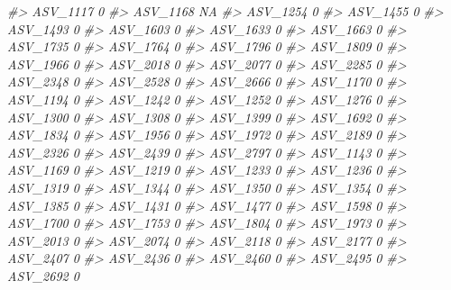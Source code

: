 \documentclass[
]{article}
\newenvironment{Shaded}{\begin{snugshade}}{\end{snugshade}}
\newcommand{\CommentTok}[1]{\textcolor[rgb]{0.56,0.35,0.01}{\textit{#1}}}
\begin{document}
\begin{Shaded}
\begin{Highlighting}[]
\CommentTok{\#\textgreater{} ASV\_1117  0}
\CommentTok{\#\textgreater{} ASV\_1168 NA}
\CommentTok{\#\textgreater{} ASV\_1254  0}
\CommentTok{\#\textgreater{} ASV\_1455  0}
\CommentTok{\#\textgreater{} ASV\_1493  0}
\CommentTok{\#\textgreater{} ASV\_1603  0}
\CommentTok{\#\textgreater{} ASV\_1633  0}
\CommentTok{\#\textgreater{} ASV\_1663  0}
\CommentTok{\#\textgreater{} ASV\_1735  0}
\CommentTok{\#\textgreater{} ASV\_1764  0}
\CommentTok{\#\textgreater{} ASV\_1796  0}
\CommentTok{\#\textgreater{} ASV\_1809  0}
\CommentTok{\#\textgreater{} ASV\_1966  0}
\CommentTok{\#\textgreater{} ASV\_2018  0}
\CommentTok{\#\textgreater{} ASV\_2077  0}
\CommentTok{\#\textgreater{} ASV\_2285  0}
\CommentTok{\#\textgreater{} ASV\_2348  0}
\CommentTok{\#\textgreater{} ASV\_2528  0}
\CommentTok{\#\textgreater{} ASV\_2666  0}
\CommentTok{\#\textgreater{} ASV\_1170  0}
\CommentTok{\#\textgreater{} ASV\_1194  0}
\CommentTok{\#\textgreater{} ASV\_1242  0}
\CommentTok{\#\textgreater{} ASV\_1252  0}
\CommentTok{\#\textgreater{} ASV\_1276  0}
\CommentTok{\#\textgreater{} ASV\_1300  0}
\CommentTok{\#\textgreater{} ASV\_1308  0}
\CommentTok{\#\textgreater{} ASV\_1399  0}
\CommentTok{\#\textgreater{} ASV\_1692  0}
\CommentTok{\#\textgreater{} ASV\_1834  0}
\CommentTok{\#\textgreater{} ASV\_1956  0}
\CommentTok{\#\textgreater{} ASV\_1972  0}
\CommentTok{\#\textgreater{} ASV\_2189  0}
\CommentTok{\#\textgreater{} ASV\_2326  0}
\CommentTok{\#\textgreater{} ASV\_2439  0}
\CommentTok{\#\textgreater{} ASV\_2797  0}
\CommentTok{\#\textgreater{} ASV\_1143  0}
\CommentTok{\#\textgreater{} ASV\_1169  0}
\CommentTok{\#\textgreater{} ASV\_1219  0}
\CommentTok{\#\textgreater{} ASV\_1233  0}
\CommentTok{\#\textgreater{} ASV\_1236  0}
\CommentTok{\#\textgreater{} ASV\_1319  0}
\CommentTok{\#\textgreater{} ASV\_1344  0}
\CommentTok{\#\textgreater{} ASV\_1350  0}
\CommentTok{\#\textgreater{} ASV\_1354  0}
\CommentTok{\#\textgreater{} ASV\_1385  0}
\CommentTok{\#\textgreater{} ASV\_1431  0}
\CommentTok{\#\textgreater{} ASV\_1477  0}
\CommentTok{\#\textgreater{} ASV\_1598  0}
\CommentTok{\#\textgreater{} ASV\_1700  0}
\CommentTok{\#\textgreater{} ASV\_1753  0}
\CommentTok{\#\textgreater{} ASV\_1804  0}
\CommentTok{\#\textgreater{} ASV\_1973  0}
\CommentTok{\#\textgreater{} ASV\_2013  0}
\CommentTok{\#\textgreater{} ASV\_2074  0}
\CommentTok{\#\textgreater{} ASV\_2118  0}
\CommentTok{\#\textgreater{} ASV\_2177  0}
\CommentTok{\#\textgreater{} ASV\_2407  0}
\CommentTok{\#\textgreater{} ASV\_2436  0}
\CommentTok{\#\textgreater{} ASV\_2460  0}
\CommentTok{\#\textgreater{} ASV\_2495  0}
\CommentTok{\#\textgreater{} ASV\_2692  0}

\end{Highlighting}
\end{Shaded}
\end{document}
